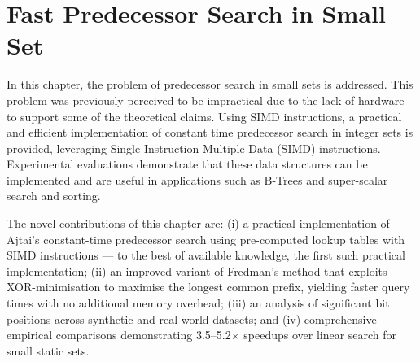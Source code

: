 \chapter{Fast Predecessor Search in Small Set}
\label{chap:predecessor}

In this chapter, the problem of predecessor search in small sets is addressed. This problem was previously perceived to be impractical due to the lack of hardware to support some of the theoretical claims. Using SIMD instructions, a practical and efficient implementation of constant time predecessor search in integer sets is provided, leveraging Single-Instruction-Multiple-Data (SIMD) instructions. Experimental evaluations demonstrate that these data structures can be implemented and are useful in applications such as B-Trees and super-scalar search and sorting.

The novel contributions of this chapter are: (i) a practical implementation of Ajtai's constant-time predecessor search using pre-computed lookup tables with SIMD instructions --- to the best of available knowledge, the first such practical implementation; (ii) an improved variant of Fredman's method that exploits XOR-minimisation to maximise the longest common prefix, yielding faster query times with no additional memory overhead; (iii) an analysis of significant bit positions across synthetic and real-world datasets; and (iv) comprehensive empirical comparisons demonstrating 3.5--5.2$\times$ speedups over linear search for small static sets.
